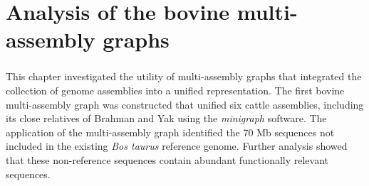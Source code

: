 \documentclass[11 pt, a4paper, notitlepage, twoside]{report}
\begin{document}




\iftwoside
\cleardoublepage
\newpage
\fi

\chapter[Bovine multi-assembly graphs]{\LARGE{Analysis of the bovine multi-assembly graphs}}
\label{chap:multigraph}

\subsection*{}
\normalsize
This chapter investigated the utility of multi-assembly graphs that integrated the collection of genome assemblies into a unified representation. The first bovine multi-assembly graph was constructed that unified six cattle assemblies, including its close relatives of Brahman and Yak using the \emph{minigraph} software. The application of the multi-assembly graph identified the 70 Mb sequences not included in the existing \emph{Bos taurus} reference genome. Further analysis showed that these non-reference sequences contain abundant functionally relevant sequences. \\

\bigskip

\begin{center}\end{center}
\end{document}
